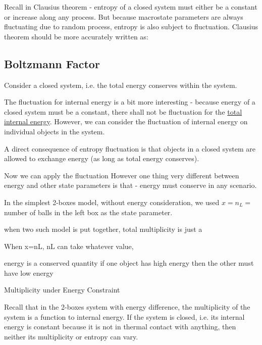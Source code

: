 \documentclass[class=article, crop=false, 12pt]{standalone}
\begin{document}
\begin{notation}
    Recall in Clausius theorem - 
    entropy of a closed system must either be a constant 
    or increase along any process.
    But because macrostate parameters are always fluctuating due to random process,
    entropy is also subject to fluctuation. 
    Clausius theorem should be more accurately written as:

\end{notation}




\subsection{Boltzmann Factor}

Consider a closed system, i.e. the total energy conserves within the system.



The fluctuation for internal energy is a bit more interesting - 
because energy of a closed system must be a constant, 
there shall not be fluctuation for the \ul{total internal energy}.
However, we can consider the fluctuation of internal energy on individual objects in the system.


A direct consequence of entropy fluctuation is that objects in a closed system are allowed to exchange energy
(as long as total energy conserves).



Now we can apply the fluctuation 
However one thing very different between energy and other state parameters is that -
energy must conserve in any scenario. 






In the simplest 2-boxes model, without energy consideration,
we used $x=n_L=$ number of balls in the left box as the state parameter. 

when two such model is put together,
total multiplicity is just a 

When x=nL, 
nL can take whatever value, 

energy is a conserved quantity
if one object has high energy then the other must have low energy

Multiplicity under Energy Constraint



Recall that in the 2-boxes system with energy difference,
the multiplicity of the system is a function to internal energy.
If the system is closed, 
i.e. its internal energy is constant because it is not in thermal contact with anything, 
then neither its multiplicity or entropy can vary.
\end{document}
